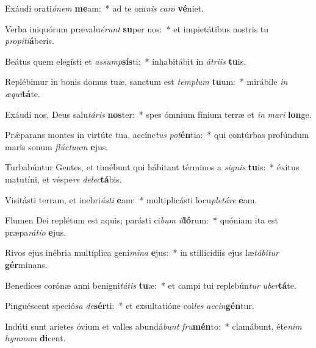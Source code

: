 \item Exáudi orati\textit{ó}\textit{nem} \textbf{me}am:~* ad te om\textit{nis} \textit{ca}\textit{ro} \textbf{vé}niet.
\item Verba iniquórum prævalu\textit{é}\textit{runt} \textbf{su}per nos:~* et impietátibus nostris tu \textit{pro}\textit{pi}\textit{ti}\textbf{á}beris.
\item Beátus quem elegísti et \textit{as}\textit{sump}\textbf{sís}ti:~* inhabitábit in \textit{á}\textit{tri}\textit{is} \textbf{tu}is.
\item Replébimur in bonis domus tuæ, sanctum est \textit{tem}\textit{plum} \textbf{tu}um:~* mirábile \textit{in} \textit{æ}\textit{qui}\textbf{tá}te.
\item Exáudi nos, Deus salu\textit{tá}\textit{ris} \textbf{nos}ter:~* spes ómnium fínium terræ et \textit{in} \textit{ma}\textit{ri} \textbf{lon}ge.
\item Prǽparans montes in virtúte tua, accínc\textit{tus} \textit{pot}\textbf{én}tia:~* qui contúrbas profúndum maris sonum \textit{flúc}\textit{tu}\textit{um} \textbf{e}jus.
\item Turbabúntur Gentes, et timébunt qui hábitant términos a \textit{si}\textit{gnis} \textbf{tu}is:~* éxitus matutíni, et véspe\textit{re} \textit{de}\textit{lec}\textbf{tá}bis.
\item Visitásti terram, et inebri\textit{ás}\textit{ti} \textbf{e}am:~* multiplicásti locu\textit{ple}\textit{tá}\textit{re} \textbf{e}am.
\item Flumen Dei replétum est aquis; parásti ci\textit{bum} \textit{il}\textbf{ló}rum:~* quóniam ita est præpa\textit{rá}\textit{ti}\textit{o} \textbf{e}jus.
\item Rivos ejus inébria multíplica gení\textit{mi}\textit{na} \textbf{e}jus:~* in stillicídiis ejus læ\textit{tá}\textit{bi}\textit{tur} \textbf{gér}minans.
\item Benedíces corónæ anni benigni\textit{tá}\textit{tis} \textbf{tu}æ:~* et campi tui replebún\textit{tur} \textit{u}\textit{ber}\textbf{tá}te.
\item Pinguéscent speció\textit{sa} \textit{de}\textbf{sér}ti:~* et exsultatióne col\textit{les} \textit{ac}\textit{cin}\textbf{gén}tur.
\item Indúti sunt aríetes óvium et valles abundá\textit{bunt} \textit{fru}\textbf{mén}to:~* clamábunt, éte\textit{nim} \textit{hym}\textit{num} \textbf{di}cent.
